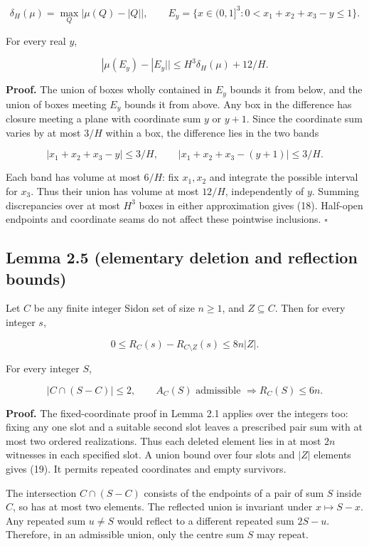 \documentclass[11pt,a4paper]{article}
\begin{document}
\[\delta_H(\mu)=\max_Q|\mu(Q)-|Q||,
\qquad E_y=\{x\in(0,1]^3:0<x_1+x_2+x_3-y\le1\}.\]

For every real \(y\),

\[|\mu(E_y)-|E_y||\le H^3\delta_H(\mu)+12/H.
\tag{18}\]

\textbf{Proof.} The union of boxes wholly contained in \(E_y\) bounds it from below, and the union of boxes meeting \(E_y\) bounds it from above. Any box in the difference has closure meeting a plane with coordinate sum \(y\) or \(y+1\). Since the coordinate sum varies by at most \(3/H\) within a box, the difference lies in the two bands

\[|x_1+x_2+x_3-y|\le3/H,\qquad
|x_1+x_2+x_3-(y+1)|\le3/H.\]

Each band has volume at most \(6/H\): fix \(x_1,x_2\) and integrate the possible interval for \(x_3\). Thus their union has volume at most \(12/H\), independently of \(y\). Summing discrepancies over at most \(H^3\) boxes in either approximation gives (18). Half-open endpoints and coordinate seams do not affect these pointwise inclusions. \hfill\(\square\)

\subsection{Lemma 2.5 (elementary deletion and reflection bounds)}\label{lemma-2.5-elementary-deletion-and-reflection-bounds}

Let \(C\) be any finite integer Sidon set of size \(n\ge1\), and \(Z\subseteq C\). Then for every integer \(s\),

\[0\le R_C(s)-R_{C\setminus Z}(s)\le8n|Z|.
\tag{19}\]

For every integer \(S\),

\[|C\cap(S-C)|\le2,
\qquad A_C(S)\text{ admissible }\Longrightarrow R_C(S)\le6n.
\tag{20}\]

\textbf{Proof.} The fixed-coordinate proof in Lemma 2.1 applies over the integers too: fixing any one slot and a suitable second slot leaves a prescribed pair sum with at most two ordered realizations. Thus each deleted element lies in at most \(2n\) witnesses in each specified slot. A union bound over four slots and \(|Z|\) elements gives (19). It permits repeated coordinates and empty survivors.

The intersection \(C\cap(S-C)\) consists of the endpoints of a pair of sum \(S\) inside \(C\), so has at most two elements. The reflected union is invariant under \(x\mapsto S-x\). Any repeated sum \(u\ne S\) would reflect to a different repeated sum \(2S-u\). Therefore, in an admissible union, only the centre sum \(S\) may repeat.
\end{document}
